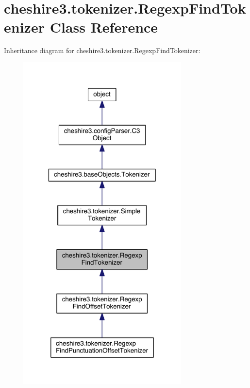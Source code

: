 \hypertarget{classcheshire3_1_1tokenizer_1_1_regexp_find_tokenizer}{\section{cheshire3.\-tokenizer.\-Regexp\-Find\-Tokenizer Class Reference}
\label{classcheshire3_1_1tokenizer_1_1_regexp_find_tokenizer}
}


Inheritance diagram for cheshire3.\-tokenizer.\-Regexp\-Find\-Tokenizer\-:
\nopagebreak
\begin{figure}[H]
\begin{center}
\leavevmode
\includegraphics[width=244pt]{classcheshire3_1_1tokenizer_1_1_regexp_find_tokenizer__inherit__graph}
\end{center}
\end{figure}


